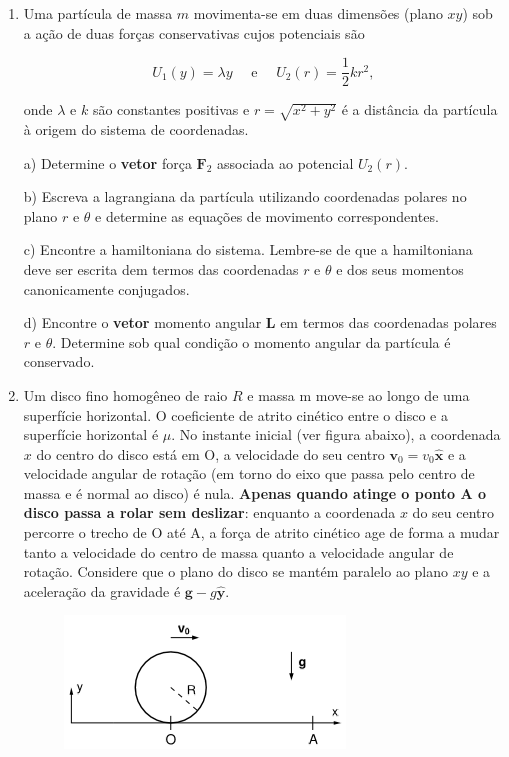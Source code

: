 \begin{enumerate}[start=1,label={\bfseries Q\arabic*.}]
\resposta




\item Uma partícula de massa $m$ movimenta-se em duas dimensões (plano $xy$) sob a ação de duas forças conservativas cujos potenciais são

$$
U_{1}(y) = \lambda y \quad  \mbox{ e } \quad U_{2}(r) = \frac{1}{2} kr^{2},
$$

onde $\lambda$ e $k$ são constantes positivas e $r = \sqrt{x^{2} + y^{2}}$ é a distância da partícula à origem do sistema de coordenadas.


a) Determine o \textbf{vetor} força $\mathbf{F}_{2}$ associada ao potencial $U_{2}(r)$.

\resposta

b) Escreva a lagrangiana da partícula utilizando coordenadas polares no plano $r$ e $\theta$ e determine as equações de movimento correspondentes.

\resposta

c) Encontre a hamiltoniana do sistema. Lembre-se de que a hamiltoniana deve ser escrita dem termos das coordenadas $r$ e $\theta$ e dos seus momentos canonicamente conjugados.

\resposta

d) Encontre o \textbf{vetor} momento angular $\mathbf{L}$ em termos das coordenadas polares $r$ e $\theta$. Determine sob qual condição o momento angular da partícula é conservado.

\resposta




\item Um disco fino homogêneo de raio $R$ e massa m move-se ao longo de uma superfície horizontal. O coeficiente de atrito cinético entre o disco e a superfície horizontal é $\mu$. No instante inicial (ver figura abaixo), a coordenada $x$ do centro do disco está em O, a velocidade do seu centro
$\mathbf{v}_{0} = v_{0}\hat{\mathbf{x}}$ e a velocidade angular de rotação (em torno do eixo que passa pelo centro de massa e é normal ao disco) é nula. \textbf{Apenas quando atinge o ponto A o disco passa a rolar sem deslizar}: enquanto a coordenada $x$ do seu centro percorre o trecho de O até A, a
força de atrito cinético age de forma a mudar tanto a velocidade do centro de massa quanto a velocidade angular de rotação. Considere que o plano do disco se mantém paralelo ao plano $xy$ e a aceleração da gravidade é $\mathbf{g} -g\hat{\mathbf{y}}$.

\begin{figure}
\centering
\includegraphics[scale=1]{classica-img/disco.png}
\end{figure}



\end{enumerate}
